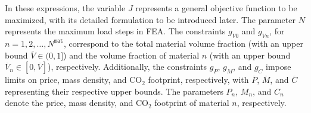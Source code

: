 \documentclass[preprint,11pt]{elsarticle}
\theoremstyle{definition}
\begin{document}
In these expressions, the variable $J$ represents a general objective function to be maximized, with its detailed formulation to be introduced later. The parameter $N$ represents the maximum load steps in FEA. The constraints $g_{V0}$ and $g_{Vn}$, for $n = 1, 2, \ldots, N^\texttt{mat}$, correspond to the total material volume fraction (with an upper bound $\overline{V} \in (0, 1]$) and the volume fraction of material $n$ (with an upper bound $\overline{V}_n \in [0, \overline{V}]$), respectively. Additionally, the constraints $g_P$, $g_M$, and $g_C$ impose limits on price, mass density, and CO$_2$ footprint, respectively, with $\overline{P}$, $\overline{M}$, and $\overline{C}$ representing their respective upper bounds. The parameters $P_n$, $M_n$, and $C_n$ denote the price, mass density, and CO$_2$ footprint of material $n$, respectively.
\end{document}
